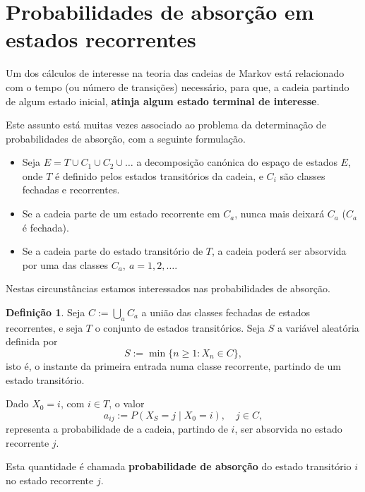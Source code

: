 \documentclass[
  11pt,
  a4paper,
]{book}
\theoremstyle{definition}
\newtheorem{definition}{Definição}[chapter]
\theoremstyle{definition}
\theoremstyle{definition}
\theoremstyle{definition}
\theoremstyle{remark}
\begin{document}
\section{Probabilidades de absorção em estados recorrentes}\label{probabilidades-de-absoruxe7uxe3o-em-estados-recorrentes}

Um dos cálculos de interesse na teoria das cadeias de Markov está relacionado com o tempo (ou número de transições) necessário, para que, a cadeia partindo de algum estado inicial, \textbf{atinja algum estado terminal de interesse}.

Este assunto está muitas vezes associado ao problema da determinação de probabilidades de absorção, com a seguinte formulação.

\begin{itemize}
\item
  Seja \(E=T \cup C_1 \cup C_2 \cup \dots\) a decomposição canónica do espaço de estados \(E\), onde \(T\) é definido pelos estados transitórios da cadeia, e \(C_i\) são classes fechadas e recorrentes.
\item
  Se a cadeia parte de um estado recorrente em \(C_a\), nunca mais deixará \(C_a\) (\(C_a\) é fechada).
\item
  Se a cadeia parte do estado transitório de \(T\), a cadeia poderá ser absorvida por uma das classes \(C_a, ~a=1,2,\dots.\)
\end{itemize}

Nestas circunstâncias estamos interessados nas probabilidades de absorção.

\begin{definition}
Seja \(C := \bigcup\limits_a C_a\) a união das classes fechadas de estados recorrentes, e seja \(T\) o conjunto de estados transitórios. Seja \(S\) a variável aleatória definida por
\[
S := \min\{n \geq 1 : X_n \in C\},
\]
isto é, o instante da primeira entrada numa classe recorrente, partindo de um estado transitório.

Dado \(X_0 = i\), com \(i \in T\), o valor
\[
a_{ij} := P(X_S = j \mid X_0 = i), \quad j \in C,
\]
representa a probabilidade de a cadeia, partindo de \(i\), ser absorvida no estado recorrente \(j\).

Esta quantidade é chamada \textbf{probabilidade de absorção} do estado transitório \(i\) no estado recorrente \(j\).
\end{definition}

\(\,\)
\end{document}

